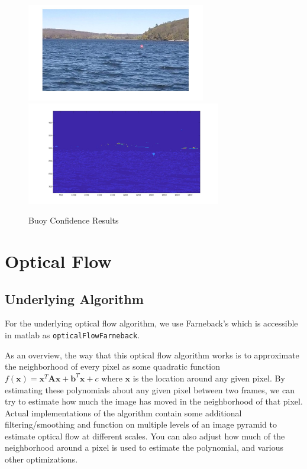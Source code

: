 \documentclass{article}
\begin{document}
\begin{figure}[H]
\includegraphics[width=7.8cm]{hsv_kmeans2_buoy}
\includegraphics[width=8.5cm]{hsv_kmeans2_buoy_result}
\centering
\caption{Buoy Confidence Results}
\label{fig:buoyconf}
\end{figure}

\section{Optical Flow}

\subsection{Underlying Algorithm}

For the underlying optical flow algorithm, we use Farneback's
\cite{farneback2003} which is accessible in matlab as
\texttt{opticalFlowFarneback}.

As an overview, the way that this optical flow algorithm works is to
approximate the neighborhood of every pixel as some quadratic function
$f(\mathbf{x}) = \mathbf{x}^T \mathbf{A} \mathbf{x} + \mathbf{b}^T \mathbf{x} + c$
where $\mathbf{x}$ is the location around any given pixel. By estimating these
polynomials about any given pixel between two frames, we can try to estimate how
much the image has moved in the neighborhood of that pixel. Actual
implementations of the algorithm contain some additional filtering/smoothing and
function on multiple levels of an image pyramid to estimate optical flow at
different scales. You can also adjust how much of the neighborhood around a
pixel is used to estimate the polynomial, and various other optimizations.
\end{document}
